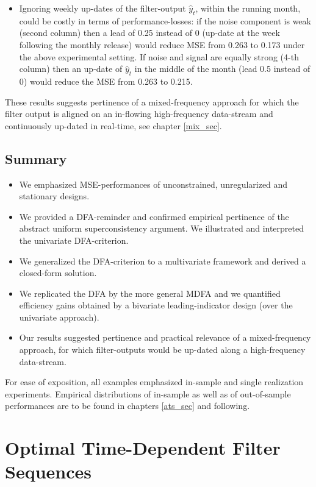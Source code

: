 \documentclass[a4paper]{book}
\begin{document}
\begin{enumerate}
\begin{itemize}
\item Ignoring weekly up-dates of the filter-output $\hat{y}_t$, within the running month, could be costly in terms of performance-losses: if the noise component is weak (second column) then a lead of 0.25 instead of 0 (up-date at the week following the monthly release) would reduce MSE from 0.263 to 0.173 under the above experimental setting. If noise and signal are equally strong (4-th column) then an up-date of $\hat{y}_t$ in the middle of the month (lead 0.5 instead of 0) would reduce the MSE from 0.263 to 0.215.    
\end{itemize}
These results suggests pertinence of a mixed-frequency approach for which the filter output is aligned on an in-flowing high-frequency data-stream and continuously up-dated in real-time, see chapter \ref{mix_sec}. 
\end{enumerate}

\section{Summary}

\begin{itemize}
\item We emphasized MSE-performances of unconstrained, unregularized and stationary designs.
\item We provided a DFA-reminder and confirmed empirical pertinence of the abstract uniform superconsistency argument. We illustrated and interpreted the univariate DFA-criterion.
\item We generalized the DFA-criterion to a multivariate framework and derived a closed-form solution. 
\item We replicated the DFA by the more general MDFA and we quantified efficiency gains obtained by a bivariate leading-indicator design (over the univariate approach).
\item Our results suggested pertinence and practical relevance of a mixed-frequency approach, for which filter-outputs would be up-dated along a high-frequency data-stream.
\end{itemize}
For ease of exposition, all  examples emphasized in-sample and single realization experiments. Empirical distributions of in-sample as well as of out-of-sample performances are to be found in chapters \ref{ats_sec} and following.




\chapter{Optimal Time-Dependent Filter Sequences}\label{vintages_triangle_revision}\label{fil_sec}
\end{document}
